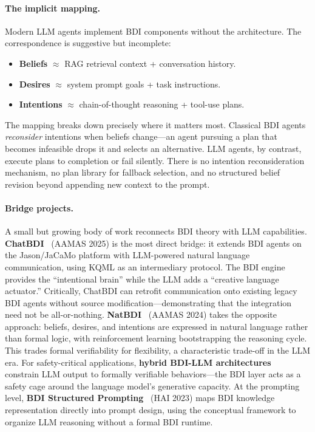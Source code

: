\documentclass{article}
\begin{document}
\paragraph{The implicit mapping.}
Modern LLM agents implement BDI components without the architecture. The correspondence
is suggestive but incomplete:
\begin{itemize}[nosep]
  \item \textbf{Beliefs} $\approx$ RAG retrieval context + conversation history.
  \item \textbf{Desires} $\approx$ system prompt goals + task instructions.
  \item \textbf{Intentions} $\approx$ chain-of-thought reasoning + tool-use plans.
\end{itemize}
The mapping breaks down precisely where it matters most. Classical BDI agents
\emph{reconsider} intentions when beliefs change---an agent pursuing a plan that
becomes infeasible drops it and selects an alternative. LLM agents, by contrast,
execute plans to completion or fail silently. There is no intention reconsideration
mechanism, no plan library for fallback selection, and no structured belief revision
beyond appending new context to the prompt.

\paragraph{Bridge projects.}
A small but growing body of work reconnects BDI theory with LLM capabilities.
\textbf{ChatBDI}~\citep{chatbdi2025} (AAMAS 2025) is the most direct bridge: it extends
BDI agents on the Jason/JaCaMo platform with LLM-powered natural language communication,
using KQML as an intermediary protocol. The BDI engine provides the ``intentional brain''
while the LLM adds a ``creative language actuator.'' Critically, ChatBDI can retrofit
communication onto existing legacy BDI agents without source modification---demonstrating
that the integration need not be all-or-nothing.
\textbf{NatBDI}~\citep{natbdi2024} (AAMAS 2024) takes the opposite approach: beliefs,
desires, and intentions are expressed in natural language rather than formal logic, with
reinforcement learning bootstrapping the reasoning cycle. This trades formal
verifiability for flexibility, a characteristic trade-off in the LLM era.
For safety-critical applications, \textbf{hybrid BDI-LLM
architectures}~\citep{hybridbdi2025} constrain LLM output to formally verifiable
behaviors---the BDI layer acts as a safety cage around the language model's generative
capacity.
At the prompting level, \textbf{BDI Structured Prompting}~\citep{bdistructured2023}
(HAI 2023) maps BDI knowledge representation directly into prompt design, using the
conceptual framework to organize LLM reasoning without a formal BDI runtime.
\end{document}
